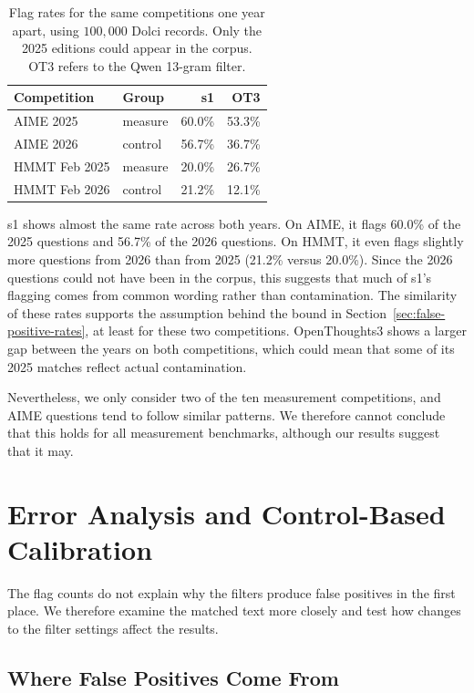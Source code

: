 \documentclass[11pt]{article}
\begin{document}
\begin{table}[t]
  \centering
  \small
  \begin{tabular}{@{}llrr@{}}
    \toprule
    Competition & Group & s1 & OT3 \\
    \midrule
    AIME 2025      & measure & 60.0\% & 53.3\% \\
    AIME 2026      & control & 56.7\% & 36.7\% \\
    HMMT Feb 2025  & measure & 20.0\% & 26.7\% \\
    HMMT Feb 2026  & control & 21.2\% & 12.1\% \\
    \bottomrule
  \end{tabular}
  \caption{Flag rates for the same competitions one year apart, using $100{,}000$ Dolci records. Only the 2025 editions could appear in the corpus. OT3 refers to the Qwen 13-gram filter.}
  \label{tab:matched}
\end{table}

s1 shows almost the same rate across both years. On AIME, it flags 60.0\% of the 2025 questions and 56.7\% of the 2026 questions. On HMMT, it even flags slightly more questions from 2026 than from 2025 (21.2\% versus 20.0\%). Since the 2026 questions could not have been in the corpus, this suggests that much of s1's flagging comes from common wording rather than contamination. The similarity of these rates supports the assumption behind the bound in Section~\ref{sec:false-positive-rates}, at least for these two competitions. OpenThoughts3 shows a larger gap between the years on both competitions, which could mean that some of its 2025 matches reflect actual contamination.

Nevertheless, we only consider two of the ten measurement competitions, and AIME questions tend to follow similar patterns. We therefore cannot conclude that this holds for all measurement benchmarks, although our results suggest that it may.

\section{Error Analysis and Control-Based Calibration}
\label{sec:error-analysis}

The flag counts do not explain why the filters produce false positives in the first place. We therefore examine the matched text more closely and test how changes to the filter settings affect the results.

\subsection{Where False Positives Come From}
\label{sec:mechanisms}
\end{document}
